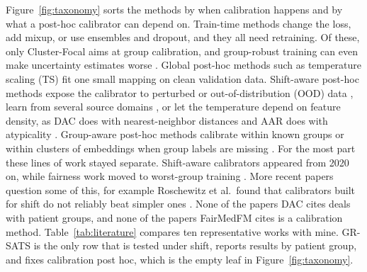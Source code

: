 \documentclass[sigconf,nonacm]{acmart}
\begin{document}
Figure~\ref{fig:taxonomy} sorts the methods by when calibration happens and by what a post-hoc calibrator can depend on. Train-time methods change the loss, add mixup, or use ensembles and dropout, and they all need retraining. Of these, only Cluster-Focal \cite{shui2023clusterfocal} aims at group calibration, and group-robust training can even make uncertainty estimates worse \cite{mehta2023evaluating}. Global post-hoc methods such as temperature scaling (TS) \cite{guo2017calibration} fit one small mapping on clean validation data. Shift-aware post-hoc methods expose the calibrator to perturbed or out-of-distribution (OOD) data \cite{tomani2021posthoc,roschewitz2025where}, learn from several source domains \cite{gong2021confidence,yu2022multidomain}, or let the temperature depend on feature density, as DAC does with nearest-neighbor distances and AAR does with atypicality \cite{tomani2023dac,yuksekgonul2023atypicality}. Group-aware post-hoc methods calibrate within known groups \cite{hebertjohnson2018multicalibration,shen2025calin} or within clusters of embeddings when group labels are missing \cite{salvador2022faircal,yang2023beyond}. For the most part these lines of work stayed separate. Shift-aware calibrators appeared from 2020 on, while fairness work moved to worst-group training \cite{sagawa2020groupdro}. More recent papers question some of this, for example Roschewitz et al.\ found that calibrators built for shift do not reliably beat simpler ones \cite{roschewitz2025where}. None of the papers DAC cites deals with patient groups, and none of the papers FairMedFM cites is a calibration method. Table~\ref{tab:literature} compares ten representative works with mine. GR-SATS is the only row that is tested under shift, reports results by patient group, and fixes calibration post hoc, which is the empty leaf in Figure~\ref{fig:taxonomy}.
\end{document}
